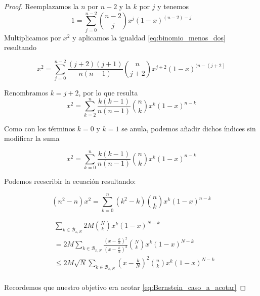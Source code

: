 \begin{proof}
    Reemplazamos la $n$ por $n-2$ y la $k$ por $j$ y tenemos 
    \begin{equation}
        1 = \sum_{j=0}^{n-2} \binom{n-2}{j} x^{j} (1-x)^{(n-2)-j}
    \end{equation}
    Multiplicamos por $x^2$ y aplicamos la igualdad \eqref{eq:binomio_menos_dos} resultando 

    \begin{equation}
        x^2 = \sum_{j=0}^{n-2} \frac{(j+2)(j+1)}{n(n-1)} \binom{n}{j+2} x^{j+2} (1-x)^{(n-(j+2)}
    \end{equation}

    Renombramos $k= j+2$, por lo que resulta
    \begin{equation}
        x^2 = \sum_{k=2}^{n} \frac{k(k-1)}{n(n-1)} \binom{n}{k} x^{k} (1-x)^{n-k}
    \end{equation}

    Como con los términos $k=0$ y $k=1$ se anula, podemos añadir dichos índices sin modificar la suma 
    
    \begin{equation}
        x^2 = \sum_{k=0}^{n} \frac{k(k-1)}{n(n-1)} \binom{n}{k} x^{k} (1-x)^{n-k}
    \end{equation}

    Podemos reescribir la ecuación resultando: 

    \begin{equation} \label{eq:desarrollo_binomio_dos}
      (n^2 - n)  x^2 = \sum_{k=0}^{n} (k^2 - k) \binom{n}{k} x^{k} (1-x)^{n-k}
    \end{equation}
    
    


\begin{equation*}  \label{eq:Bernstein_caso_a_acotar}
    \begin{split}
    & \sum_{k \in \mathcal{B}_{x,N}} 2M \binom{N}{k} x^k (1-x) ^{N-k} \\
    & = 2M  \sum_{k \in \mathcal{B}_{x,N}}  \frac{(x- \frac{k}{N})^2}{(x- \frac{k}{N})^2} \binom{N}{k} x^k (1-x) ^{N-k} \\
    & \leq 2M \sqrt{N} \sum_{k \in \mathcal{B}_{x,N}}  (x- \frac{k}{N})^2 \binom{n}{k} x^k (1-x) ^{N-k} \\
\end{split}
\end{equation*}


Recordemos que nuestro objetivo era acotar \ref{eq:Bernstein_caso_a_acotar}


\end{proof}
